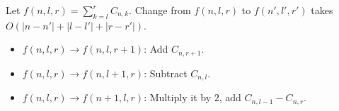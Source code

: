 Let $f(n, l, r) = \sum_{k=l}^{r} C_{n, k}$.
Change from $f(n, l, r)$ to $f(n', l', r')$ takes $O(|n-n'|+|l-l'|+|r-r'|)$.
\begin{itemize}
	\item $f(n, l, r) \to f(n, l, r+1)$: Add $C_{n, r+1}$.
	\item $f(n, l, r) \to f(n, l+1, r)$: Subtract $C_{n, l}$.
	\item $f(n, l, r) \to f(n+1, l, r)$: Multiply it by $2$, add $C_{n, l-1} - C_{n, r}$.
\end{itemize}